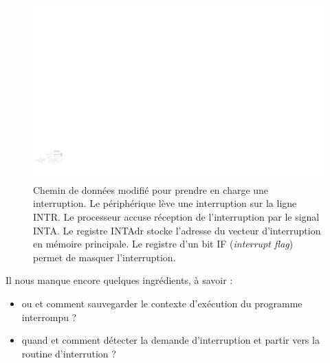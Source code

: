 \begin{figure}[htbp]
\includegraphics[width=\linewidth]{Figs/premier_chemin_seq_irq.pdf}
\caption{\label{fig:interrupt} Chemin de données modifié pour prendre en charge une interruption. Le périphérique lève une interruption sur la ligne INTR. Le processeur accuse réception de l'interruption par le signal INTA. Le registre INTAdr stocke l'adresse du vecteur d'interruption en mémoire principale. Le registre d'un bit IF (\emph{interrupt flag}) permet de masquer l'interruption.}
\end{figure}


Il nous manque encore quelques ingrédients, à savoir :
\begin{itemize}
\item ou et comment sauvegarder le contexte d'exécution du programme interrompu ?
\item quand et comment détecter la demande d'interruption et partir vers la routine d'interrution ?
\end{itemize}

